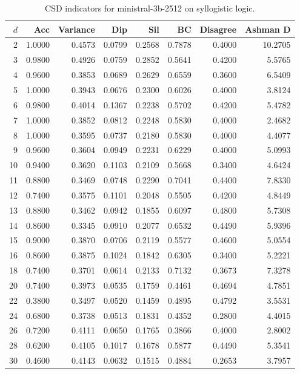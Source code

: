 \documentclass[11pt]{article}
\begin{document}
\begin{table}[h]\centering\scriptsize
\caption{CSD indicators for ministral-3b-2512 on syllogistic logic.}
\begin{tabular}{r|r|r|r|r|r|r|r}
\toprule
$d$ & Acc & Variance & Dip & Sil & BC & Disagree & Ashman D \\
\midrule
2 & 1.0000 & 0.4573 & 0.0799 & 0.2568 & 0.7878 & 0.4000 & 10.2705 \\
3 & 0.9800 & 0.4926 & 0.0759 & 0.2852 & 0.5641 & 0.4200 & 5.5765 \\
4 & 0.9600 & 0.3853 & 0.0689 & 0.2629 & 0.6559 & 0.3600 & 6.5409 \\
5 & 1.0000 & 0.3943 & 0.0676 & 0.2300 & 0.6026 & 0.4000 & 3.8124 \\
6 & 0.9800 & 0.4014 & 0.1367 & 0.2238 & 0.5702 & 0.4200 & 5.4782 \\
7 & 1.0000 & 0.3852 & 0.0812 & 0.2248 & 0.5830 & 0.4000 & 2.4682 \\
8 & 1.0000 & 0.3595 & 0.0737 & 0.2180 & 0.5830 & 0.4000 & 4.4077 \\
9 & 0.9600 & 0.3604 & 0.0949 & 0.2231 & 0.6229 & 0.4000 & 5.0993 \\
10 & 0.9400 & 0.3620 & 0.1103 & 0.2109 & 0.5668 & 0.3400 & 4.6424 \\
11 & 0.8800 & 0.3469 & 0.0748 & 0.2290 & 0.7041 & 0.4400 & 7.8330 \\
12 & 0.7400 & 0.3575 & 0.1101 & 0.2048 & 0.5505 & 0.4200 & 4.8449 \\
13 & 0.8800 & 0.3462 & 0.0942 & 0.1855 & 0.6097 & 0.4800 & 5.7308 \\
14 & 0.8600 & 0.3345 & 0.0910 & 0.2077 & 0.6532 & 0.4490 & 5.9396 \\
15 & 0.9000 & 0.3870 & 0.0706 & 0.2119 & 0.5577 & 0.4600 & 5.0554 \\
16 & 0.8600 & 0.3875 & 0.1024 & 0.1842 & 0.6305 & 0.3400 & 5.2221 \\
18 & 0.7400 & 0.3701 & 0.0614 & 0.2133 & 0.7132 & 0.3673 & 7.3278 \\
20 & 0.7400 & 0.3973 & 0.0535 & 0.1759 & 0.4461 & 0.4694 & 4.7851 \\
22 & 0.3800 & 0.3497 & 0.0520 & 0.1459 & 0.4895 & 0.4792 & 3.5531 \\
24 & 0.6800 & 0.3738 & 0.0513 & 0.1831 & 0.4352 & 0.2800 & 4.4015 \\
26 & 0.7200 & 0.4111 & 0.0650 & 0.1765 & 0.3866 & 0.4000 & 2.8002 \\
28 & 0.6200 & 0.4105 & 0.1017 & 0.1678 & 0.5877 & 0.4490 & 5.3541 \\
30 & 0.4600 & 0.4143 & 0.0632 & 0.1515 & 0.4884 & 0.2653 & 3.7957 \\
\bottomrule
\end{tabular}
\end{table}
\end{document}
